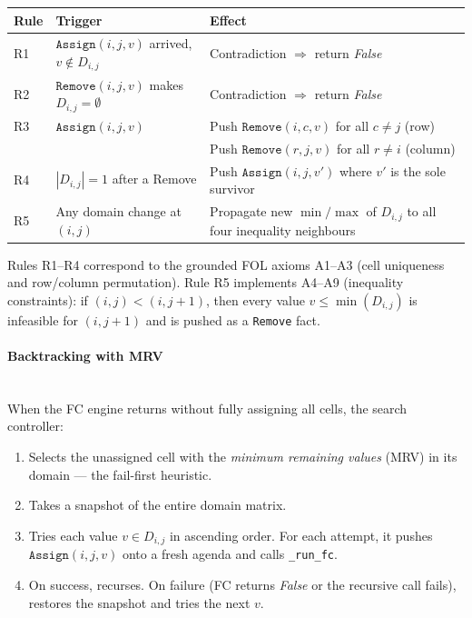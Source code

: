 \begin{center}
\begin{tabular}{lll}
\hline
\textbf{Rule} & \textbf{Trigger} & \textbf{Effect} \\
\hline
R1 & $\texttt{Assign}(i,j,v)$ arrived, $v \notin D_{i,j}$ &
     Contradiction $\Rightarrow$ return \textit{False} \\
R2 & $\texttt{Remove}(i,j,v)$ makes $D_{i,j} = \emptyset$ &
     Contradiction $\Rightarrow$ return \textit{False} \\
R3 & $\texttt{Assign}(i,j,v)$ &
     Push $\texttt{Remove}(i,c,v)$ for all $c \neq j$ (row) \\
   & & Push $\texttt{Remove}(r,j,v)$ for all $r \neq i$ (column) \\
R4 & $|D_{i,j}| = 1$ after a Remove &
     Push $\texttt{Assign}(i,j,v')$ where $v'$ is the sole survivor \\
R5 & Any domain change at $(i,j)$ &
     Propagate new $\min/\max$ of $D_{i,j}$ to all four inequality neighbours \\
\hline
\end{tabular}
\end{center}

Rules R1--R4 correspond to the grounded FOL axioms A1--A3 (cell uniqueness
and row/column permutation).  Rule R5 implements A4--A9 (inequality
constraints): if $(i,j) < (i,j{+}1)$, then every value $v \leq
\min(D_{i,j})$ is infeasible for $(i,j{+}1)$ and is pushed as a
\texttt{Remove} fact.

\paragraph{Backtracking with MRV}~\\
When the FC engine returns without fully assigning all cells, the search
controller:
\begin{enumerate}
    \item Selects the unassigned cell with the \emph{minimum remaining
    values} (MRV) in its domain — the fail-first heuristic.
    \item Takes a snapshot of the entire domain matrix.
    \item Tries each value $v \in D_{i,j}$ in ascending order.  For each
    attempt, it pushes $\texttt{Assign}(i,j,v)$ onto a fresh agenda and
    calls \texttt{\_run\_fc}.
    \item On success, recurses.  On failure (FC returns \textit{False} or
    the recursive call fails), restores the snapshot and tries the next $v$.
\end{enumerate}

